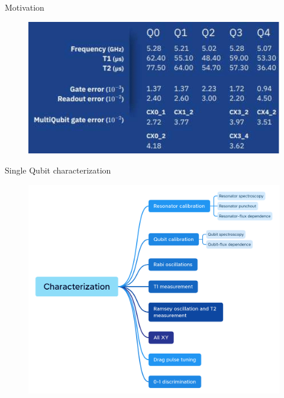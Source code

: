 \documentclass[11p,aspectratio=169]{beamer}
\begin{document}
\begin{frame}{Motivation}
\begin{multicols*}{2}
                \begin{figure}
                    \includegraphics[width = 0.5 \textwidth]{figures/ibm.png}
                \end{figure}
            \end{multicols*}
            
            
    

\end{frame}

\begin{frame}{Single Qubit characterization}
    \begin{figure}
        \includegraphics[width= 0.8 \textwidth]{figures/Characterization.png}
    \end{figure}
\end{frame}
\end{document}
